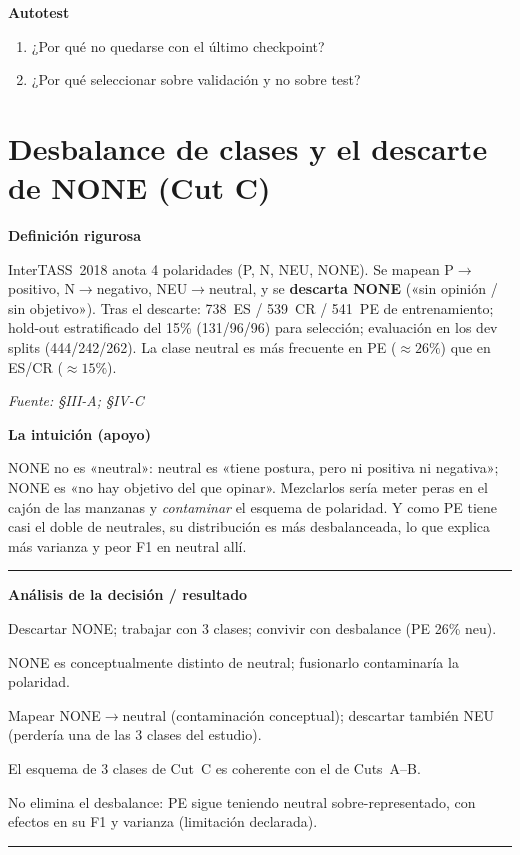 \documentclass[11pt,a4paper]{article}
\newcommand{\nivel}[1]{\medskip\noindent\textbf{\textcolor{blue!45!black}{#1}}\par\nopagebreak\smallskip}
\newcommand{\fuente}[1]{\nopagebreak\par\hfill{\footnotesize\textit{Fuente: #1}}\par}
\newenvironment{analisis}{%
  \medskip\par\noindent\rule{\linewidth}{0.4pt}\par\nopagebreak
  \textbf{Análisis de la decisión / resultado}\par\nopagebreak\smallskip
  \begin{description}[leftmargin=2.6cm,style=nextline,font=\bfseries]
}{%
  \end{description}\noindent\rule{\linewidth}{0.4pt}\par\medskip
}
\begin{document}
\nivel{Autotest}
\begin{enumerate}[nosep]
  \item ¿Por qué no quedarse con el último checkpoint?
  \item ¿Por qué seleccionar sobre validación y no sobre test?
\end{enumerate}

\section{Desbalance de clases y el descarte de NONE (Cut C)}\label{sec:none}

\nivel{Definición rigurosa}
InterTASS~2018 anota 4 polaridades (P, N, NEU, NONE). Se mapean P$\to$positivo, N$\to$negativo,
NEU$\to$neutral, y se \textbf{descarta NONE} («sin opinión / sin objetivo»). Tras el descarte: 738~ES
/ 539~CR / 541~PE de entrenamiento; hold-out estratificado del 15\% (131/96/96) para selección;
evaluación en los dev splits (444/242/262). La clase neutral es más frecuente en PE ($\approx26\%$)
que en ES/CR ($\approx15\%$).
\fuente{\S III-A; \S IV-C}

\nivel{La intuición (apoyo)}
NONE no es «neutral»: neutral es «tiene postura, pero ni positiva ni negativa»; NONE es «no hay
objetivo del que opinar». Mezclarlos sería meter peras en el cajón de las manzanas y \emph{contaminar}
el esquema de polaridad. Y como PE tiene casi el doble de neutrales, su distribución es más
desbalanceada, lo que explica más varianza y peor F1 en neutral allí.

\begin{analisis}
  \item[Qué] Descartar NONE; trabajar con 3 clases; convivir con desbalance (PE 26\% neu).
  \item[Por qué] NONE es conceptualmente distinto de neutral; fusionarlo contaminaría la polaridad.
  \item[Alternativas descartadas] Mapear NONE$\to$neutral (contaminación conceptual); descartar
        también NEU (perdería una de las 3 clases del estudio).
  \item[Qué significa] El esquema de 3 clases de Cut~C es coherente con el de Cuts~A--B.
  \item[Qué NO significa] No elimina el desbalance: PE sigue teniendo neutral sobre-representado, con
        efectos en su F1 y varianza (limitación declarada).
\end{analisis}
\end{document}
